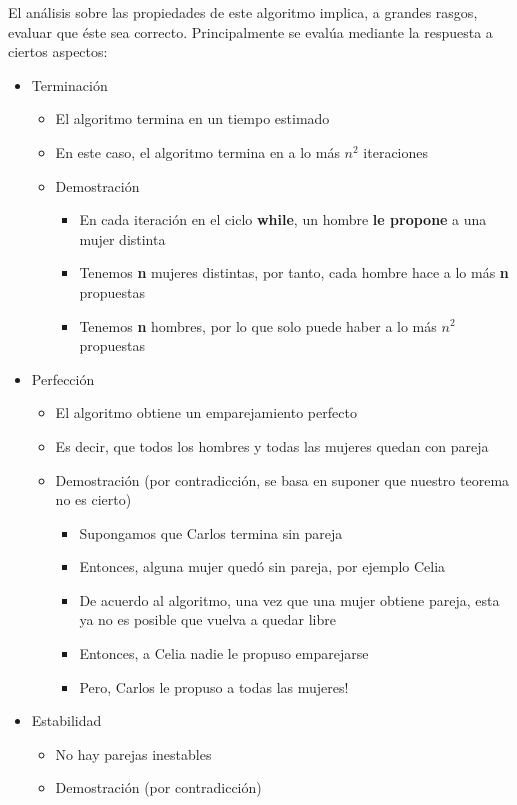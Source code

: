 \documentclass[letterpaper, 12pt]{article}
\begin{document}
El análisis sobre las propiedades de este algoritmo implica, a grandes rasgos,
evaluar que éste sea correcto. Principalmente se evalúa mediante la respuesta
a ciertos aspectos:
\begin{itemize}
\item Terminación
\begin{itemize}
\item El algoritmo termina en un tiempo estimado
\item En este caso, el algoritmo termina en a lo más \(n^2\) iteraciones
\item Demostración
\begin{itemize}
\item En cada iteración en el ciclo \textbf{while}, un hombre \textbf{le propone} a una mujer
distinta
\item Tenemos \textbf{n} mujeres distintas, por tanto, cada hombre hace a lo más \textbf{n}
propuestas
\item Tenemos \textbf{n} hombres, por lo que solo puede haber a lo más \(n^2\) propuestas
\end{itemize}
\end{itemize}
\item Perfección
\begin{itemize}
\item El algoritmo obtiene un emparejamiento perfecto
\item Es decir, que todos los hombres y todas las mujeres quedan con pareja
\item Demostración (por contradicción, se basa en suponer que nuestro teorema no
es cierto)
\begin{itemize}
\item Supongamos que Carlos termina sin pareja
\item Entonces, alguna mujer quedó sin pareja, por ejemplo Celia
\item De acuerdo al algoritmo, una vez que una mujer obtiene pareja, esta ya no
es posible que vuelva a quedar libre
\item Entonces, a Celia nadie le propuso emparejarse
\item Pero, Carlos le propuso a todas las mujeres!
\end{itemize}
\end{itemize}
\item Estabilidad
\begin{itemize}
\item No hay parejas inestables
\item Demostración (por contradicción)

\end{itemize}
\end{itemize}
\end{document}
